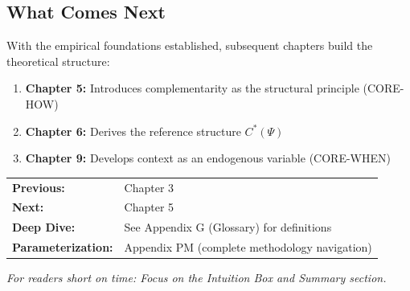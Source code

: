 \subsection{What Comes Next}
\label{sec:ch4-next}

With the empirical foundations established, subsequent chapters build the theoretical structure:

\begin{enumerate}[nosep]
    \item \textbf{Chapter 5:} Introduces complementarity as the structural principle (CORE-HOW)
    \item \textbf{Chapter 6:} Derives the reference structure $C^*(\Psi)$
    \item \textbf{Chapter 9:} Develops context as an endogenous variable (CORE-WHEN)
\end{enumerate}

\begin{tcolorbox}[
    colback=green!5!white,
    colframe=green!75!black,
    title={\textbf{Reading Path}},
    fonttitle=\bfseries
]
\begin{tabular}{@{}ll@{}}
\textbf{Previous:} & Chapter 3 \\
\textbf{Next:} & Chapter 5 \\
\textbf{Deep Dive:} & See Appendix G (Glossary) for definitions \\
\textbf{Parameterization:} & Appendix PM (complete methodology navigation) \\
\end{tabular}

\medskip
\textit{For readers short on time: Focus on the Intuition Box and Summary section.}
\end{tcolorbox}

